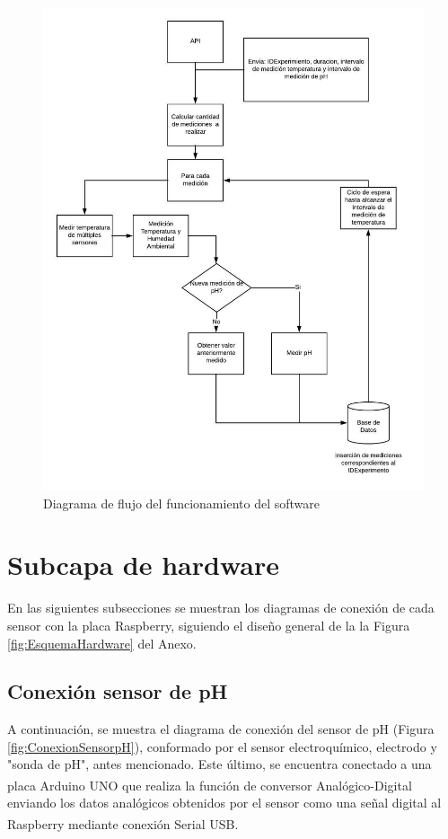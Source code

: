         \begin{figure}[H]
            \centering
            \includegraphics[scale=0.8]{hardware/DiagramadeFlujoPython.jpeg}
            \caption{Diagrama de flujo del funcionamiento del software }
            \label{FlujoPython}
        \end{figure}

\section{Subcapa de hardware}
    \par En las siguientes subsecciones se muestran los diagramas de conexión de cada sensor con la placa Raspberry, siguiendo el diseño general de la la Figura \ref{fig:EsquemaHardware} del Anexo.

    \subsection{Conexión sensor de pH}
        \par A continuación, se muestra el diagrama de conexión del sensor de pH (Figura \ref{fig:ConexionSensorpH}), conformado por el sensor electroquímico, electrodo y "sonda de pH", antes mencionado. Este último, se encuentra conectado a una placa Arduino\textsuperscript{\textregistered} UNO que realiza la función de conversor Analógico-Digital enviando los datos analógicos obtenidos por el sensor como una señal digital al Raspberry\textsuperscript{\textregistered} mediante conexión Serial USB.
        
